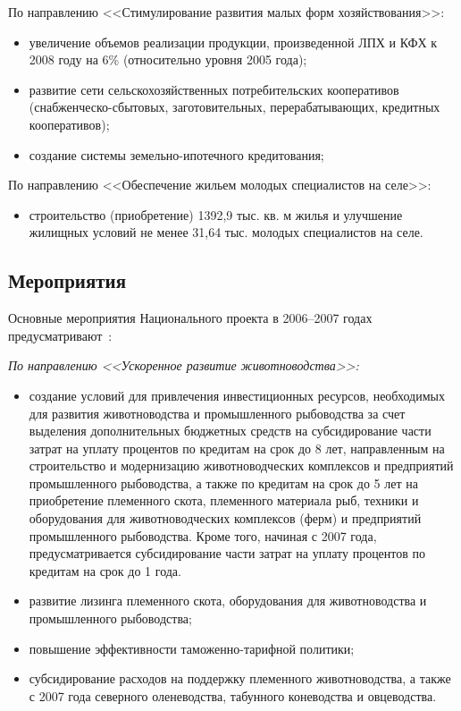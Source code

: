 \documentclass[article, 12pt, russian, oneside]{ncc}
\begin{document}
По направлению <<Стимулирование развития малых форм хозяйствования>>:

\begin{itemize}
\item увеличение объемов реализации продукции, произведенной ЛПХ и КФХ
  к 2008 году на 6\% (относительно уровня 2005 года);
\item развитие сети сельскохозяйственных потребительских кооперативов
  (снабженческо-сбытовых, заготовительных, перерабатывающих, кредитных
  кооперативов);
\item создание системы земельно-ипотечного кредитования;
\end{itemize}

По направлению <<Обеспечение жильем молодых специалистов на селе>>:

\begin{itemize}
\item строительство (приобретение) 1392,9 тыс. кв. м жилья и улучшение
  жилищных условий не менее 31,64 тыс. молодых специалистов на селе.
\end{itemize}


\subsection{Мероприятия}

Основные мероприятия Национального проекта в 2006--2007 годах
предусматривают~\cite{APK_Waitings}:

\emph{По направлению <<Ускоренное развитие животноводства>>:}

\begin{itemize}
\item создание условий для привлечения инвестиционных ресурсов,
  необходимых для развития животноводства и промышленного рыбоводства
  за счет выделения дополнительных бюджетных средств на субсидирование
  части затрат на уплату процентов по кредитам на срок до 8 лет,
  направленным на строительство и модернизацию животноводческих
  комплексов и предприятий промышленного рыбоводства, а также по
  кредитам на срок до 5 лет на приобретение племенного скота,
  племенного материала рыб, техники и оборудования для
  животноводческих комплексов (ферм) и предприятий промышленного
  рыбоводства. Кроме того, начиная с 2007 года, предусматривается
  субсидирование части затрат на уплату процентов по кредитам на срок
  до 1 года.
\item развитие лизинга племенного скота, оборудования для
  животноводства и промышленного рыбоводства;
\item повышение эффективности таможенно-тарифной политики;
\item субсидирование расходов на поддержку племенного животноводства,
  а также с 2007 года северного оленеводства, табунного коневодства и
  овцеводства.
\end{itemize}
\end{document}
